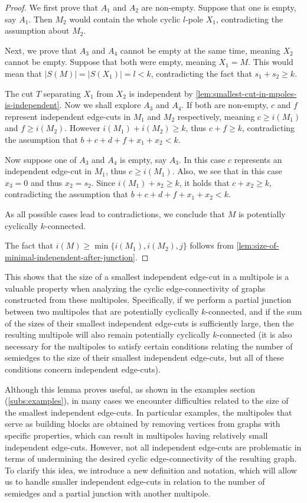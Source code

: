 \documentclass[12pt, twoside]{book}
\begin{document}
\begin{proof}
	We first prove that $A_1$ and $A_2$ are non-empty. Suppose that one is empty, say $A_1$. Then $M_2$ would contain the whole cyclic $l$-pole $X_1$, contradicting the assumption about $M_2$.
	
	Next, we prove that $A_3$ and $A_4$ cannot be empty at the same time, meaning $X_2$ cannot be empty. Suppose that both were empty, meaning $X_1=M$. This would mean that $|S(M)|=|S(X_1)|=l<k$, contradicting the fact that $s_1+s_2\geq k$.
	
	The cut $T$ separating $X_1$ from $X_2$ is independent by \cref{lem:smallest-cut-in-mpoles-is-independent}. Now we shall explore $A_3$ and $A_4$. If both are non-empty, $c$ and $f$ represent independent edge-cuts in $M_1$ and $M_2$ respectively, meaning ${c\geq i(M_1)}$ and ${f\geq i(M_2)}$. However ${i(M_1)+i(M_2)\geq k}$, thus $c+f\geq k$, contradicting the assumption that ${b+c+d+f+x_1+x_2<k}$.
	
	Now suppose one of $A_3$ and $A_4$ is empty, say $A_3$. In this case $c$ represents an independent edge-cut in $M_1$, thus $c\geq i(M_1)$. Also, we see that in this case $x_3=0$ and thus $x_2=s_2$. Since $i(M_1)+s_2\geq k$, it holds that $c+x_2\geq k$, contradicting the assumption that ${b+c+d+f+x_1+x_2<k}$.
	
	As all possible cases lead to contradictions, we conclude that $M$ is potentially cyclically \mbox{$k$-connected}.
	
	The fact that ${i(M)\geq \min\{i(M_1), i(M_2), j\}}$ follows from \cref{lem:size-of-minimal-independent-after-junction}.
\end{proof}

This shows that the size of a smallest independent edge-cut in a multipole is a valuable property when analyzing the cyclic edge-connectivity of graphs constructed from these multipoles. Specifically, if we perform a partial junction between two multipoles that are potentially cyclically $k$-connected, and if the sum of the sizes of their smallest independent edge-cuts is sufficiently large, then the resulting multipole will also remain potentially cyclically $k$-connected (it is also necessary for the multipoles to satisfy certain conditions relating the number of semiedges to the size of their smallest independent edge-cuts, but all of these conditions concern independent edge-cuts).

Although this lemma proves useful, as shown in the examples section (\cref{subs:examples}), in many cases we encounter difficulties related to the size of the smallest independent edge-cuts. In particular examples, the multipoles that serve as building blocks are obtained by removing vertices from graphs with specific properties, which can result in multipoles having relatively small independent edge-cuts. However, not all independent edge-cuts are problematic in terms of undermining the desired cyclic edge-connectivity of the resulting graph. To clarify this idea, we introduce a new definition and notation, which will allow us to handle smaller independent edge-cuts in relation to the number of semiedges and a partial junction with another multipole.
\end{document}
